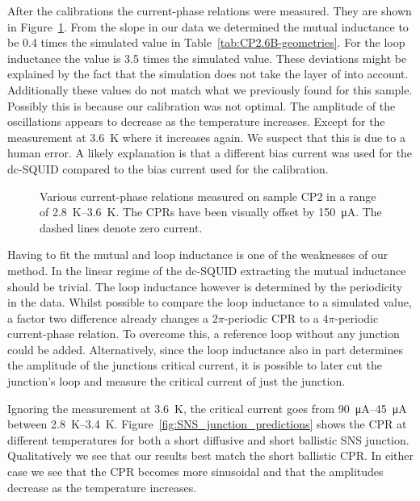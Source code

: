 After the calibrations the current-phase relations were measured. They are shown in Figure~\ref{fig:CP2.6B_revisited_CPRs}. From the slope in our data we determined the mutual inductance to be 0.4 times the simulated value in Table~\ref{tab:CP2.6B-geometries}. For the loop inductance the value is 3.5 times the simulated value. These deviations might be explained by the fact that the simulation does not take the layer of  into account. Additionally these values do not match what we previously found for this sample. Possibly this is because our calibration was not optimal. The amplitude of the oscillations appears to decrease as the temperature increases. Except for the measurement at \qty{3.6}{\kelvin} where it increases again. We suspect that this is due to a human error. A likely explanation is that a different bias current was used for the dc-SQUID compared to the bias current used for the calibration.

\begin{figure}[ht!]
	\centering
	
	\caption{Various current-phase relations measured on sample CP2 in a range of \qtyrange{2.8}{3.6}{\kelvin}. The CPRs have been visually offset by \qty{150}{\micro\ampere}. The dashed lines denote zero current.}
	\label{fig:CP2.6B_revisited_CPRs}
\end{figure}

Having to fit the mutual and loop inductance is one of the weaknesses of our method. In the linear regime of the dc-SQUID extracting the mutual inductance should be trivial. The loop inductance however is determined by the periodicity in the data. Whilst possible to compare the loop inductance to a simulated value, a factor two difference already changes a $2\pi$-periodic CPR to a $4\pi$-periodic current-phase relation. To overcome this, a reference loop without any junction could be added. Alternatively, since the loop inductance also in part determines the amplitude of the junctions critical current, it is possible to later cut the junction's loop and measure the critical current of just the junction.

Ignoring the measurement at \qty{3.6}{\kelvin}, the critical current goes from \qtyrange{90}{45}{\micro\ampere} between \qtyrange{2.8}{3.4}{\kelvin}. Figure~\ref{fig:SNS_junction_predictions} shows the CPR at different temperatures for both a short diffusive and short ballistic SNS junction. Qualitatively we see that our results best match the short ballistic CPR. In either case we see that the CPR becomes more sinusoidal and that the amplitudes decrease as the temperature increases.

